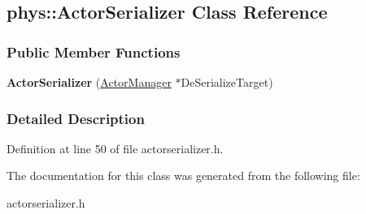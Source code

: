 \hypertarget{classphys_1_1ActorSerializer}{
\subsection{phys::ActorSerializer Class Reference}
\label{classphys_1_1ActorSerializer}
}
\subsubsection*{Public Member Functions}
\begin{DoxyCompactItemize}
\item 
\hypertarget{classphys_1_1ActorSerializer_a43865678e9a65bc41887d1b9c066ee0f}{
{\bfseries ActorSerializer} (\hyperlink{classphys_1_1ActorManager}{ActorManager} $\ast$DeSerializeTarget)}
\label{classphys_1_1ActorSerializer_a43865678e9a65bc41887d1b9c066ee0f}

\end{DoxyCompactItemize}


\subsubsection{Detailed Description}


Definition at line 50 of file actorserializer.h.



The documentation for this class was generated from the following file:\begin{DoxyCompactItemize}
\item 
actorserializer.h\end{DoxyCompactItemize}
